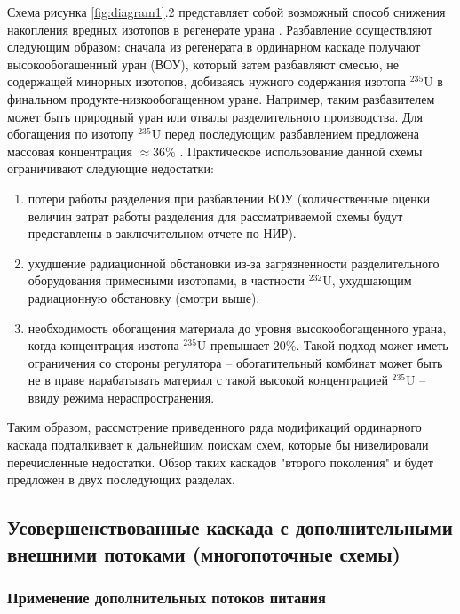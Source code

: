Схема рисунка \ref{fig:diagram1}.2 представляет собой возможный способ снижения накопления вредных изотопов в регенерате урана \cite{SposobIzotopnogoVosstanovleniyaa}. Разбавление осуществляют следующим образом: сначала из регенерата в ординарном каскаде получают высокообогащенный уран (ВОУ), который затем разбавляют смесью, не содержащей минорных изотопов, добиваясь нужного содержания изотопа $^{235}$U в финальном продукте-низкообогащенном уране. Например, таким разбавителем может быть природный уран или отвалы разделительного производства. Для обогащения по изотопу $^{235}$U перед последующим разбавлением предложена массовая концентрация $\approx$36\% \cite{SposobIzotopnogoVosstanovleniyaa}. Практическое использование данной схемы ограничивают следующие недостатки: 
\begin{enumerate}
  \item потери работы разделения при разбавлении ВОУ (количественные оценки величин затрат работы разделения для рассматриваемой схемы будут представлены в заключительном отчете по НИР).
  \item ухудшение радиационной обстановки из-за загрязненности разделительного оборудования примесными изотопами, в частности $^{232}$U, ухудшающим радиационную обстановку (смотри выше).
  \item необходимость обогащения материала до уровня высокообогащенного урана, когда концентрация изотопа $^{235}$U превышает 20\%. Такой подход может иметь ограничения со стороны регулятора -- обогатительный комбинат может быть не в праве нарабатывать материал с такой высокой концентрацией $^{235}$U -- ввиду режима нераспространения.
\end{enumerate}

Таким образом, рассмотрение приведенного ряда модификаций ординарного каскада подталкивает к дальнейшим поискам схем, которые бы нивелировали перечисленные недостатки.
Обзор таких каскадов "второго поколения" и будет предложен в двух последующих разделах.

\subsection{Усовершенствованные каскада с дополнительными внешними потоками (многопоточные схемы)}

\subsubsection{Применение дополнительных потоков питания}

